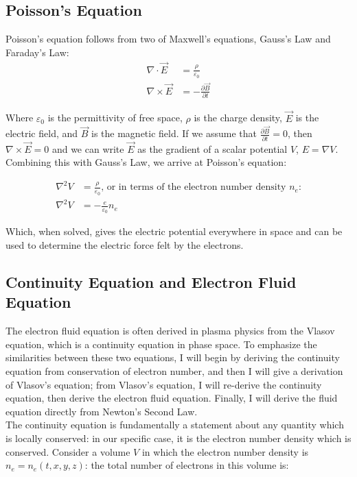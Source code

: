 \documentclass[11pt]{article}
\begin{document}
\subsection{Poisson's Equation}
Poisson's equation follows from two of Maxwell's equations, Gauss's Law and Faraday's Law:
\begin{align}
    \nabla \cdot \vec{E} & = \frac{\rho}{\varepsilon_0} \\
    \nabla \times \vec{E} & = -\frac{\partial{\vec{B}}}{\partial{t}}
\end{align}

Where $\varepsilon_0$ is the permittivity of free space, $\rho$ is the charge density, $\vec{E}$ is the electric field, and $\vec{B}$ is the magnetic field. If we assume that $\frac{\partial{\vec{B}}}{\partial{t}} = 0$, then $\nabla \times \vec{E} = 0$ and we can write $\vec{E}$ as the gradient of a scalar potential $V$, $E=\nabla V$. Combining this with Gauss's Law, we arrive at Poisson's equation:

\begin{align}
    \nabla^2 V & = \frac{\rho}{\varepsilon_0} \text{, or in terms of the electron number density $n_e$:} \\
    \nabla^2 V & = -\frac{e}{\varepsilon_0}n_e
\end{align}

Which, when solved, gives the electric potential everywhere in space and can be used to determine the electric force felt by the electrons.

\subsection{Continuity Equation and Electron Fluid Equation}
The electron fluid equation is often derived in plasma physics from the Vlasov equation, which is a continuity equation in phase space. To emphasize the similarities between these two equations, I will begin by deriving the continuity equation from conservation of electron number, and then I will give a derivation of Vlasov's equation; from Vlasov's equation, I will re-derive the continuity equation, then derive the electron fluid equation. Finally, I will derive the fluid equation directly from Newton's Second Law. \\

The continuity equation is fundamentally a statement about any quantity which is locally conserved: in our specific case, it is the electron number density which is conserved. Consider a volume $V$ in which the electron number density is $n_e=n_e(t,x,y,z)$: the total number of electrons in this volume is:
\end{document}
